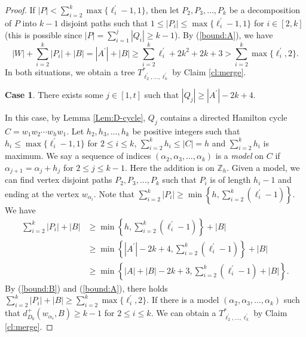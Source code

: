 \documentclass[10pt,a4paper]{article}
\theoremstyle{definition}
\newtheorem{case}{Case}
\begin{document}
\begin{proof}
If $|P|<\sum_{i=2}^k \max\{\ell^\prime_i-1,1\}$, then let $P_2,P_3,\ldots,P_k$ be a decomposition of $P$ into $k-1$ disjoint paths such that $1\leq |P_i|\leq \max\{\ell^\prime_i-1,1\}$ for $i\in [2,k]$ (this is possible since $|P|=\sum_{i=1}^j |Q_i|\geq k-1$).
By (\ref{bound:A}), we have
$$|W|+\sum_{i=2}^k|P_i|+|B|=|A^\prime|+|B|\geq \sum_{i=2}^k \ell^\prime_i+2k^2+2k+3>\sum_{i=2}^k \max\{\ell^\prime_i,2\}.$$
In both situations, we obtain a tree $T^*_{ \ell^\prime_2, \ldots, \ell^\prime_k}$ by Claim \ref{cl:merge}.


\begin{case}
There exists some $j\in[1,t]$ such that $|Q_j|\geq |A^\prime|-2k+4$.
\end{case}
In this case, by Lemma \ref{Lem:D-cycle}, $Q_j$ contains a directed Hamilton cycle $C=w_1w_2\cdots w_hw_1$.
Let $h_2,h_3,\ldots,h_k$ be positive integers such that $h_i\leq \max\{\ell^\prime_i-1,1\}$ for $2\leq i\leq k$, $\sum_{i=2}^k h_i\leq |C|=h$  and $\sum_{i=2}^k h_i$ is maximum.
We say a sequence of indices $(\alpha_2,\alpha_3,\ldots,\alpha_k)$ is a {\it model} on $C$ if $\alpha_{j+1}=\alpha_{j}+h_{j}$ for $2\leq j\leq k-1$. Here the addition is on $\mathbb{Z}_h$. Given a model, we can find vertex disjoint paths $P_2,P_3,\ldots,P_k$ such that $P_i$ is of length $h_i-1$ and ending at the vertex $w_{\alpha_i}$.
Note that $\sum_{i=2}^k|P_i|\geq \min\left\{h, \sum_{i=2}^k(\ell^\prime_i-1)\right\}$. We have
\begin{align*}
\sum_{i=2}^k|P_i|+|B|&\geq \min\left\{h, \sum_{i=2}^k(\ell^\prime_i-1)\right\}+|B|\\
&\geq \min\left\{|A^\prime|-2k+4,\sum_{i=2}^k(\ell^\prime_i-1)\right\}+|B|\\
&\geq \min\left\{|A|+|B|-2k+3,\sum_{i=2}^k(\ell^\prime_i-1)+|B|\right\}.
\end{align*}
By (\ref{bound:B}) and (\ref{bound:A}), there holds
$\sum_{i=2}^k|P_i|+|B|\geq \sum_{i=2}^k \max\{\ell^\prime_i,2\}$.
If there is a model $(\alpha_2,\alpha_3,\ldots,\alpha_k)$ such that $d^+_{D_0}(w_{\alpha_i},B)\geq k-1$ for $2\leq i\leq k$. We can obtain a $T^*_{ \ell^\prime_2, \ldots, \ell^\prime_k}$ by Claim \ref{cl:merge}.


\end{proof}
\end{document}
